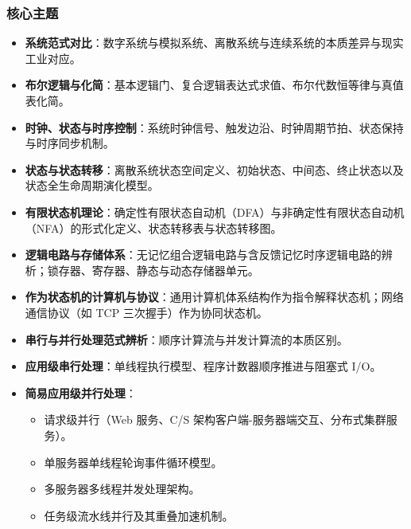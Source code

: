 \subsubsection{核心主题}
\begin{itemize}
    \item \textbf{系统范式对比}：数字系统与模拟系统、离散系统与连续系统的本质差异与现实工业对应。
    \item \textbf{布尔逻辑与化简}：基本逻辑门、复合逻辑表达式求值、布尔代数恒等律与真值表化简。
    \item \textbf{时钟、状态与时序控制}：系统时钟信号、触发边沿、时钟周期节拍、状态保持与时序同步机制。
    \item \textbf{状态与状态转移}：离散系统状态空间定义、初始状态、中间态、终止状态以及状态全生命周期演化模型。
    \item \textbf{有限状态机理论}：确定性有限状态自动机（DFA）与非确定性有限状态自动机（NFA）的形式化定义、状态转移表与状态转移图。
    \item \textbf{逻辑电路与存储体系}：无记忆组合逻辑电路与含反馈记忆时序逻辑电路的辨析；锁存器、寄存器、静态与动态存储器单元。
    \item \textbf{作为状态机的计算机与协议}：通用计算机体系结构作为指令解释状态机；网络通信协议（如 TCP 三次握手）作为协同状态机。
    \item \textbf{串行与并行处理范式辨析}：顺序计算流与并发计算流的本质区别。
    \item \textbf{应用级串行处理}：单线程执行模型、程序计数器顺序推进与阻塞式 I/O。
    \item \textbf{简易应用级并行处理}：
    \begin{itemize}
        \item 请求级并行（Web 服务、C/S 架构客户端-服务器端交互、分布式集群服务）。
        \item 单服务器单线程轮询事件循环模型。
        \item 多服务器多线程并发处理架构。
        \item 任务级流水线并行及其重叠加速机制。
    \end{itemize}
\end{itemize}

